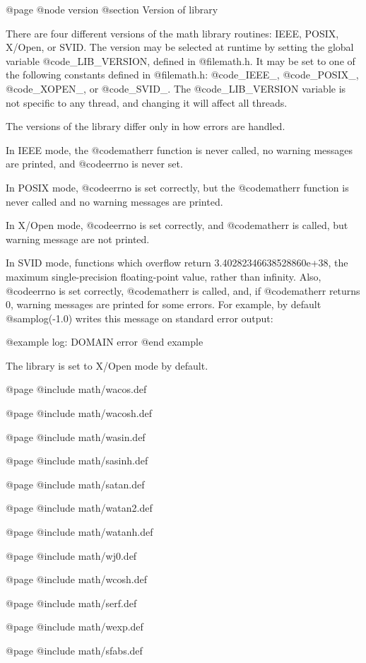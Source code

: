 @page
@node version
@section Version of library

There are four different versions of the math library routines: IEEE,
POSIX, X/Open, or SVID.  The version may be selected at runtime by
setting the global variable @code{_LIB_VERSION}, defined in
@file{math.h}.  It may be set to one of the following constants defined
in @file{math.h}: @code{_IEEE_}, @code{_POSIX_}, @code{_XOPEN_}, or
@code{_SVID_}.  The @code{_LIB_VERSION} variable is not specific to any
thread, and changing it will affect all threads.

The versions of the library differ only in how errors are handled.

In IEEE mode, the @code{matherr} function is never called, no warning
messages are printed, and @code{errno} is never set.

In POSIX mode, @code{errno} is set correctly, but the @code{matherr}
function is never called and no warning messages are printed.

In X/Open mode, @code{errno} is set correctly, and @code{matherr} is
called, but warning message are not printed.

In SVID mode, functions which overflow return 3.40282346638528860e+38,
the maximum single-precision floating-point value, rather than infinity.
Also, @code{errno} is set correctly, @code{matherr} is called, and, if
@code{matherr} returns 0, warning messages are printed for some errors.
For example, by default @samp{log(-1.0)} writes this message on standard
error output:

@example
log: DOMAIN error
@end example

The library is set to X/Open mode by default.

@page
@include math/wacos.def

@page
@include math/wacosh.def

@page
@include math/wasin.def

@page
@include math/sasinh.def

@page
@include math/satan.def

@page
@include math/watan2.def

@page
@include math/watanh.def

@page
@include math/wj0.def

@page
@include math/wcosh.def

@page
@include math/serf.def

@page
@include math/wexp.def

@page
@include math/sfabs.def

